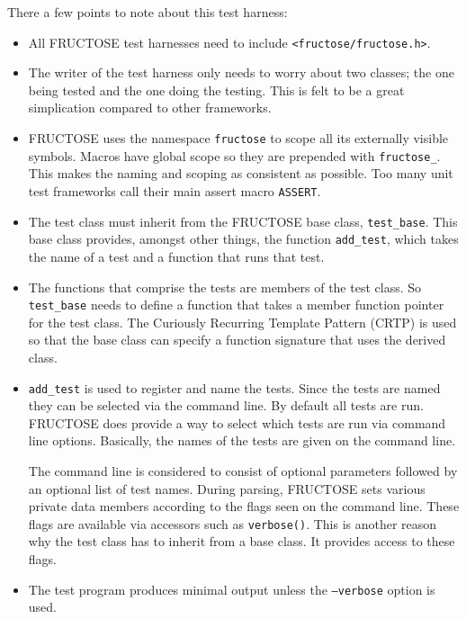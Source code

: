 \documentclass{book}
\begin{document}
There a few points to note about this test harness:

\begin{itemize}
\item All FRUCTOSE test harnesses need to include {\tt <fructose/fructose.h>}.

\item The writer of the test harness only needs
to worry about two classes; the one being tested and the one doing the
testing. This is felt to be a great simplication compared to other
frameworks.

\item FRUCTOSE uses the namespace {\tt fructose} to scope all its externally
visible symbols. Macros have global scope so they are prepended with
{\tt fructose\_}. This makes the naming and scoping as consistent as possible.
Too many unit test frameworks call their main assert macro {\tt ASSERT}.

\item The test class must inherit from the FRUCTOSE base class, {\tt test\_base}. 
This base class provides, amongst other things, 
the function {\tt add\_test}, which takes the name of a test and a function
that runs that test. 

\item The functions that comprise the tests are members of the test class.
So {\tt test\_base} needs to define a function that takes a member function 
pointer for the test class.
The Curiously Recurring Template Pattern (CRTP) is used so that the base class can
specify a function signature that uses the derived class.

\item 
{\tt add\_test} is used to register and name the tests.
Since the tests are named they can be selected via the command line.
By default all tests are run.
FRUCTOSE does provide a way to select which tests are run via command line options.
Basically, the names of the tests are given on the command line.

The command line is considered to consist of optional parameters
followed by an optional list of test names.
During parsing, FRUCTOSE sets various private data members according to the
flags seen on the command line. These flags are available via accessors
such as {\tt verbose()}. This is another reason why the test class has
to inherit from a base class. It provides access to these flags.

\item The test program produces minimal output unless the 
{\tt --verbose} option is used.
\end{itemize}
\end{document}
